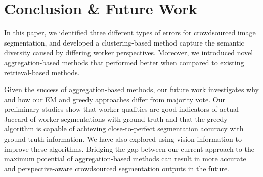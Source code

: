 \section{Conclusion \& Future Work}
In this paper, we identified three different types of errors for crowdsourced image segmentation, and developed a clustering-based method capture the semantic diversity caused by differing worker perspectives. Moreover, we introduced novel aggregation-based methods that performed better when compared to existing retrieval-based methods.
\par Given the success of aggregation-based methods, our future work investigates why and how our EM and greedy approaches differ from majority vote. Our preliminary studies show that worker qualities are good indicators of actual Jaccard of worker segmentations with ground truth and that the greedy algorithm is capable of achieving close-to-perfect segmentation accuracy with ground truth information. We have also explored using vision information to improve these algorithms. Bridging the gap between our current approach to the maximum potential of aggregation-based methods can result in more accurate and perspective-aware crowdsourced segmentation outputs in the future.